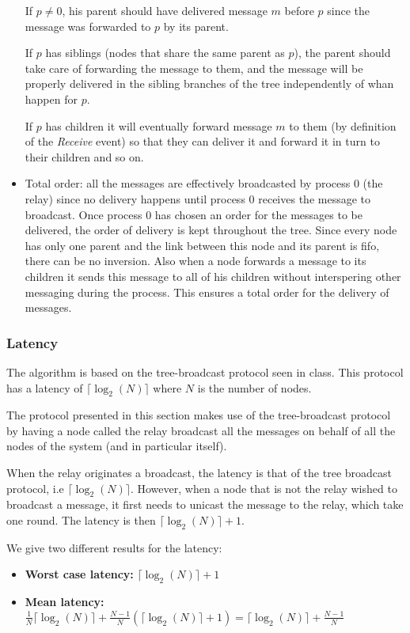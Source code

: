 \documentclass[a4paper]{article}
\begin{document}
\begin{itemize}
	If $p \neq 0$, his parent should have delivered message $m$ before
	$p$ since the message was forwarded to $p$ by its parent.

	If $p$ has siblings (nodes that share the same parent as $p$), the
	parent should take care of forwarding the message to them, and the
	message will be properly delivered in the sibling branches of the
	tree independently of whan happen for $p$.

	If $p$ has children it will eventually forward message $m$ to them
	(by definition of the \textit{Receive} event) so that they can
	deliver it and forward it in turn to their children and so on.
    \item Total order: all the messages are effectively broadcasted by process
	$0$ (the relay) since no delivery happens until process $0$ receives
	the message to broadcast. Once process $0$ has chosen an order for the
	messages to be delivered, the order of delivery is kept throughout the
	tree. Since every node has only one parent and the link between this
	node and its parent is fifo, there can be no inversion. Also when a
	node forwards a message to its children it sends this message to all
	of his children without interspering other messaging during the
	process. This ensures a total order for the delivery of messages.
\end{itemize}

\subsubsection*{Latency}
The algorithm is based on the tree-broadcast protocol seen in class. This
protocol has a latency of $\lceil\log_2(N)\rceil$ where $N$ is the number of
nodes.

The protocol presented in this section makes use of the tree-broadcast
protocol by having a node called the relay broadcast all the messages on
behalf of all the nodes of the system (and in particular itself).

When the relay originates a broadcast, the latency is that of the tree
broadcast protocol, i.e $\lceil\log_2(N)\rceil$. However, when a node that is
not the relay wished to broadcast a message, it first needs to unicast the
message to the relay, which take one round. The latency is then
$\lceil\log_2(N)\rceil + 1$.

We give two different results for the latency:
\begin{itemize}
    \item \textbf{Worst case latency:} $\lceil\log_2(N)\rceil + 1$
    \item \textbf{Mean latency:} $\frac{1}{N} \lceil\log_2(N)\rceil +
	                          \frac{N-1}{N} (\lceil\log_2(N)\rceil + 1)
	                          = \lceil\log_2(N)\rceil + \frac{N-1}{N}$
\end{itemize}
\end{document}
